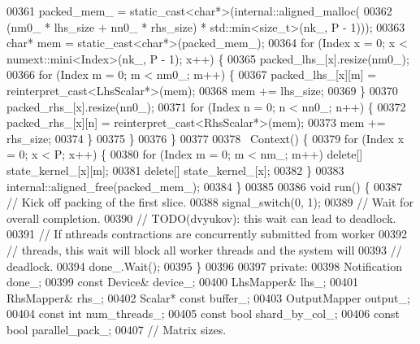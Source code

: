 \begin{DoxyCode}
00361       packed\_mem\_ = \textcolor{keyword}{static\_cast<}\textcolor{keywordtype}{char}*\textcolor{keyword}{>}(internal::aligned\_malloc(
00362           (nm0\_ * lhs\_size + nn0\_ * rhs\_size) * std::min<size\_t>(nk\_, P - 1)));
00363       \textcolor{keywordtype}{char}* mem = \textcolor{keyword}{static\_cast<}\textcolor{keywordtype}{char}*\textcolor{keyword}{>}(packed\_mem\_);
00364       \textcolor{keywordflow}{for} (Index x = 0; x < numext::mini<Index>(nk\_, P - 1); x++) \{
00365         packed\_lhs\_[x].resize(nm0\_);
00366         \textcolor{keywordflow}{for} (Index m = 0; m < nm0\_; m++) \{
00367           packed\_lhs\_[x][m] = \textcolor{keyword}{reinterpret\_cast<}LhsScalar*\textcolor{keyword}{>}(mem);
00368           mem += lhs\_size;
00369         \}
00370         packed\_rhs\_[x].resize(nn0\_);
00371         \textcolor{keywordflow}{for} (Index n = 0; n < nn0\_; n++) \{
00372           packed\_rhs\_[x][n] = \textcolor{keyword}{reinterpret\_cast<}RhsScalar*\textcolor{keyword}{>}(mem);
00373           mem += rhs\_size;
00374         \}
00375       \}
00376     \}
00377 
00378     ~Context() \{
00379       \textcolor{keywordflow}{for} (Index x = 0; x < P; x++) \{
00380         \textcolor{keywordflow}{for} (Index m = 0; m < nm\_; m++) \textcolor{keyword}{delete}[] state\_kernel\_[x][m];
00381         \textcolor{keyword}{delete}[] state\_kernel\_[x];
00382       \}
00383       internal::aligned\_free(packed\_mem\_);
00384     \}
00385 
00386     \textcolor{keywordtype}{void} run() \{
00387       \textcolor{comment}{// Kick off packing of the first slice.}
00388       signal\_switch(0, 1);
00389       \textcolor{comment}{// Wait for overall completion.}
00390       \textcolor{comment}{// TODO(dvyukov): this wait can lead to deadlock.}
00391       \textcolor{comment}{// If nthreads contractions are concurrently submitted from worker}
00392       \textcolor{comment}{// threads, this wait will block all worker threads and the system will}
00393       \textcolor{comment}{// deadlock.}
00394       done\_.Wait();
00395     \}
00396 
00397    \textcolor{keyword}{private}:
00398     Notification done\_;
00399     \textcolor{keyword}{const} Device& device\_;
00400     LhsMapper& lhs\_;
00401     RhsMapper& rhs\_;
00402     Scalar* \textcolor{keyword}{const} buffer\_;
00403     OutputMapper output\_;
00404     \textcolor{keyword}{const} \textcolor{keywordtype}{int} num\_threads\_;
00405     \textcolor{keyword}{const} \textcolor{keywordtype}{bool} shard\_by\_col\_;
00406     \textcolor{keyword}{const} \textcolor{keywordtype}{bool} parallel\_pack\_;
00407     \textcolor{comment}{// Matrix sizes.}

\end{DoxyCode}
